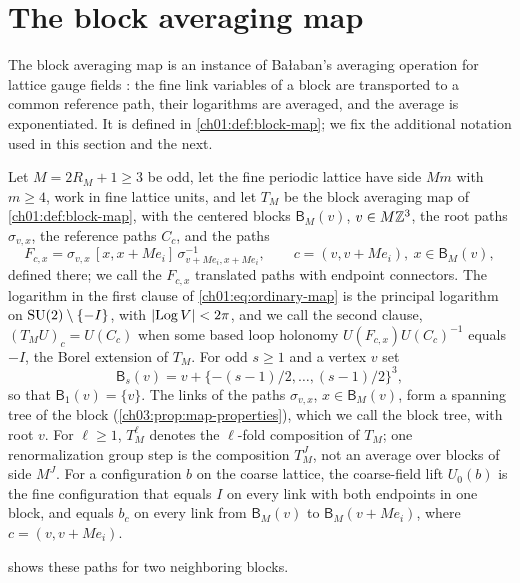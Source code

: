\section{The block averaging map}\label{ch03:sec:map}

The block averaging map is an instance of Bałaban's averaging operation for lattice gauge fields \cite[eq.~(15)]{Balaban1985Averaging}: the fine link variables of a block are transported to a common reference path, their logarithms are averaged, and the average is exponentiated. It is defined in \cref{ch01:def:block-map}; we fix the additional notation used in this section and the next.

\begin{definition}\label{ch03:def:centered-map}
Let $M=2R_M+1\ge3$ be odd, let the fine periodic lattice have side $Mm$ with $m\ge4$, work in fine lattice units, and let $T_M$ be the block averaging map of \cref{ch01:def:block-map}, with the centered blocks $\mathsf B_M(v)$, $v\in M\mathbb Z^3$, the root paths $\sigma_{v,x}$, the reference paths $C_c$, and the paths
\[
 F_{c,x}=\sigma_{v,x}\,[x,x+Me_i]\,\sigma_{v+Me_i,x+Me_i}^{-1},\qquad c=(v,v+Me_i),\ x\in\mathsf B_M(v),
\]
defined there; we call the $F_{c,x}$ translated paths with endpoint connectors. The logarithm in the first clause of \eqref{ch01:eq:ordinary-map} is the principal logarithm on $\mathrm{SU}(2)\setminus\{-I\}$, with $\lvert \operatorname{Log} V\rvert<2\pi$, and we call the second clause, $(T_MU)_c=U(C_c)$ when some based loop holonomy $U(F_{c,x})U(C_c)^{-1}$ equals $-I$, the Borel extension of $T_M$. For odd $s\ge1$ and a vertex $v$ set
\[
 \mathsf B_s(v)=v+\{-(s-1)/2,\dots,(s-1)/2\}^3,
\]
so that $\mathsf B_1(v)=\{v\}$. The links of the paths $\sigma_{v,x}$, $x\in\mathsf B_M(v)$, form a spanning tree of the block (\cref{ch03:prop:map-properties}), which we call the block tree, with root $v$. For $\ell\ge1$, $T_M^\ell$ denotes the $\ell$-fold composition of $T_M$; one renormalization group step is the composition $T_M^J$, not an average over blocks of side $M^J$. For a configuration $b$ on the coarse lattice, the coarse-field lift $U_0(b)$ is the fine configuration that equals $I$ on every link with both endpoints in one block, and equals $b_c$ on every link from $\mathsf B_M(v)$ to $\mathsf B_M(v+Me_i)$, where $c=(v,v+Me_i)$.
\end{definition}

 shows these paths for two neighboring blocks.

